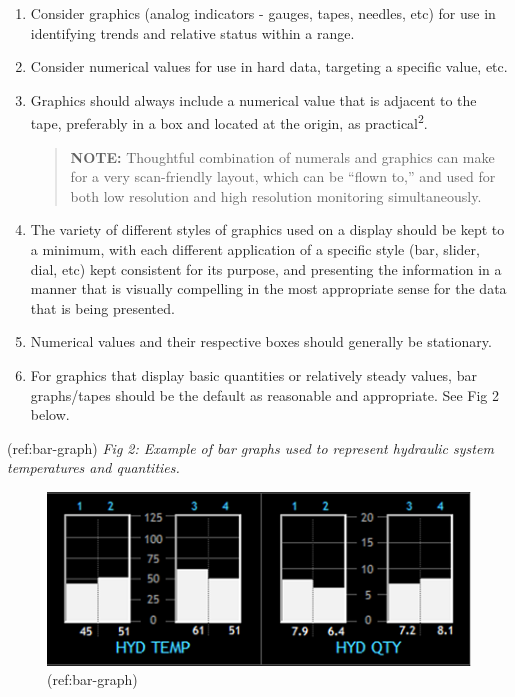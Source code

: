 \documentclass[
]{book}
\begin{document}
\begin{enumerate}
\begin{enumerate}
    \begin{enumerate}
    \def\labelenumiii{\arabic{enumiii}.}
    \item
      Consider graphics (analog indicators - gauges, tapes, needles, etc) for use in identifying trends and relative status within a range.
    \item
      Consider numerical values for use in hard data, targeting a specific value, etc.
    \item
      Graphics should always include a numerical value that is adjacent to the tape, preferably in a box and located at the origin, as practical\textsuperscript{2}.

      \begin{quote}
      \textbf{NOTE:} Thoughtful combination of numerals and graphics can make for a very scan-friendly layout, which can be ``flown to,'' and used for both low resolution and high resolution monitoring simultaneously.
      \end{quote}
    \item
      The variety of different styles of graphics used on a display should be kept to a minimum, with each different application of a specific style (bar, slider, dial, etc) kept consistent for its purpose, and presenting the information in a manner that is visually compelling in the most appropriate sense for the data that is being presented.
    \item
      Numerical values and their respective boxes should generally be stationary.
    \item
      For graphics that display basic quantities or relatively steady values, bar graphs/tapes should be the default as reasonable and appropriate. See Fig 2 below.
    \end{enumerate}

    (ref:bar-graph) \emph{Fig 2: Example of bar graphs used to represent hydraulic system temperatures and quantities.}

    \begin{figure}
    \centering
    \includegraphics{media/21/bar-graphs.png}
    \caption{(ref:bar-graph)}
    \end{figure}


\end{enumerate}
\end{enumerate}
\end{document}
